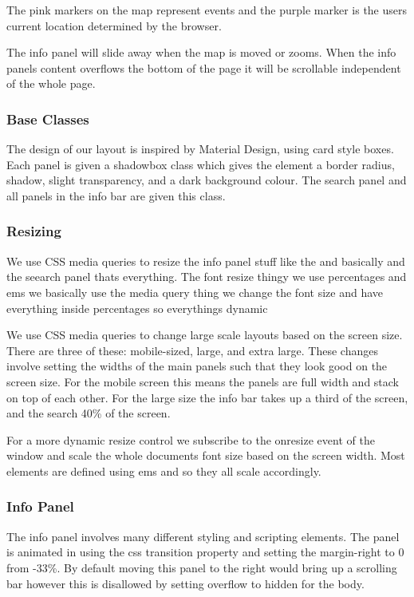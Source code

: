 \documentclass[10pt]{article}
\begin{document}
                The pink markers on the map represent events and the purple marker is the users current location determined by the browser.

                The info panel will slide away when the map is moved or zooms. When the info panels content overflows the bottom of the page it will be scrollable independent of the whole page.


            \subsubsection{Base Classes}
                The design of our layout is inspired by Material Design, using card style boxes. Each panel is given a shadowbox class which gives the element a border radius, shadow, slight transparency, and a dark background colour. The search panel and all panels in the info bar are given this class.

            \subsubsection{Resizing}
                We use CSS media queries to resize the info panel stuff like the and basically and the seearch panel thats everything. The font resize thingy we use percentages and ems we basically use the media query thing we change the font size and have everything inside percentages so everythings dynamic

                We use CSS media queries to change large scale layouts based on the screen size. There are three of these: mobile-sized, large, and extra large. These changes involve setting the widths of the main panels such that they look good on the screen size. For the mobile screen this means the panels are full width and stack on top of each other. For the large size the info bar takes up a third of the screen, and the search 40\% of the screen.

                For a more dynamic resize control we subscribe to the onresize event of the window and scale the whole documents font size based on the screen width. Most elements are defined using ems and so they all scale accordingly.

            \subsubsection{Info Panel}
                The info panel involves many different styling and scripting elements. The panel is animated in using the css transition property and setting the margin-right to 0 from -33\%. By default moving this panel to the right would bring up a scrolling bar however this is disallowed by setting overflow to hidden for the body.
\end{document}
